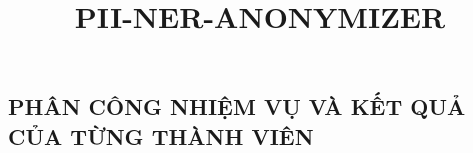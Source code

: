 \documentclass[oneside,final]{hcmut-report-vi}
\title{PII-NER-ANONYMIZER}
\begin{document}
\coverpage
\thispagestyle{empty}
\clearpage


\pagestyle{plain}
\setcounter{page}{1}


\clearpage

\tableofcontents
\clearpage

\listoffigures
\clearpage

\listoftables
\clearpage

\lstlistoflistings
\clearpage

\subsection*{\centering PHÂN CÔNG NHIỆM VỤ VÀ KẾT QUẢ CỦA TỪNG THÀNH VIÊN}
\end{document}

